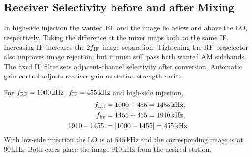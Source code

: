 \documentclass[12pt,a4paper]{article}
\begin{document}
\subsection{Receiver Selectivity before and after Mixing}
In high-side injection the wanted RF and the image lie below and above the LO, respectively. Taking the difference at the mixer maps both to the same IF. Increasing IF increases the $2f_{\rm IF}$ image separation. Tightening the RF preselector also improves image rejection, but it must still pass both wanted AM sidebands. The fixed IF filter sets adjacent-channel selectivity after conversion. Automatic gain control adjusts receiver gain as station strength varies.

\begin{tcolorbox}[tikzbox, unbreakable, title={Two RF Inputs Can Produce the Same Intermediate Frequency}]
\centering
{}\par
\end{tcolorbox}

\begin{tcolorbox}[examplebox, title={Compute LO and Image Frequencies}]
For $f_{\rm RF}=1000\,\mathrm{kHz}$, $f_{\rm IF}=455\,\mathrm{kHz}$ and high-side injection,
\[
\begin{aligned}
 f_{\rm LO}&=1000+455=1455\,\mathrm{kHz},\\
 f_{\rm im}&=1455+455=1910\,\mathrm{kHz},\\
 |1910-1455|&=|1000-1455|=455\,\mathrm{kHz}.
\end{aligned}
\]
With low-side injection the LO is at $545\,\mathrm{kHz}$ and the corresponding image is at $90\,\mathrm{kHz}$. Both cases place the image $910\,\mathrm{kHz}$ from the desired station.
\end{tcolorbox}
\end{document}
